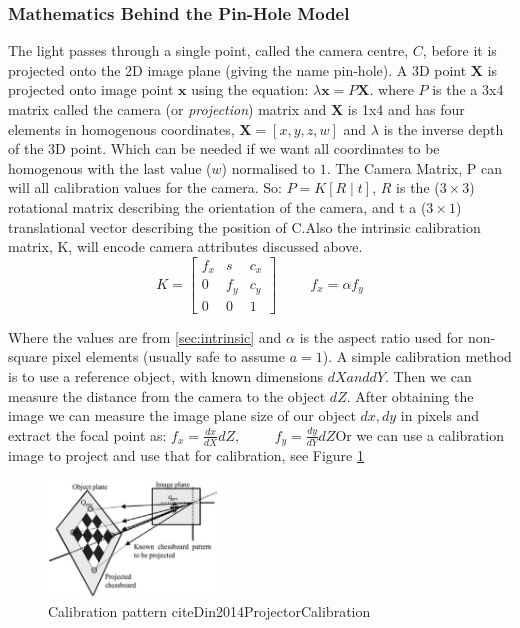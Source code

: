 \subsubsection{Mathematics Behind the Pin-Hole Model}
The light passes through a single point, called the camera centre, $C$, before it is projected onto the 2D image plane (giving the name pin-hole). A 3D point $\textbf{X}$ is projected onto image point $\textbf{x}$ using the equation:
\(\lambda \textbf{x} = P\textbf{X}\). where $P$ is the a 3x4 matrix called the camera (or \emph{projection}) matrix and $\textbf{X}$ is 1x4 and has four elements in homogenous coordinates, \(\textbf{X} = [x, y, z, w]\) and $\lambda$ is the inverse depth of the 3D point. Which can be needed if we want all coordinates to be homogenous with the last value ($w$) normalised to $1$.
The Camera Matrix, P can will all calibration values for the camera. So: \(P = K \left[R \mid t\right] \), $R$ is the ($3 \times 3$) rotational matrix describing the orientation of the camera, and t a ($3 \times 1$) translational vector describing the position of C.Also the intrinsic calibration matrix, K, will encode camera attributes discussed above.
\[
  K = 
  \begin{bmatrix}
    f_x & s & c_x \\
    0 & f_y & c_y \\
    0 & 0 & 1
  \end{bmatrix}
  \hspace{1cm}
  f_x = \alpha f_y
\]

Where the values are from \ref{sec:intrinsic} and $\alpha$ is the aspect ratio used for non-square pixel elements (usually safe to assume $a=1$). A simple calibration method is to use a reference object, with known dimensions $dX and dY$. Then we can measure the distance from the camera to the object $dZ$. After obtaining the image we can measure the image plane size of our object $dx, dy$ in pixels and extract the focal point as: \(
  f_x = \frac{dx}{dX} dZ , \hspace{1cm} f_y = \frac{dy}{dY}dZ
  \)Or we can use a calibration image to project and use that for calibration, see Figure \ref{fig:calin-dots}

  \begin{figure}[h]
    \centering
    \includegraphics[width=0.4\textwidth]{assets/background/checkered.jpeg}
    \caption{Calibration pattern cite{Din2014ProjectorCalibration}}\label{fig:calin-dots}
  \end{figure}

